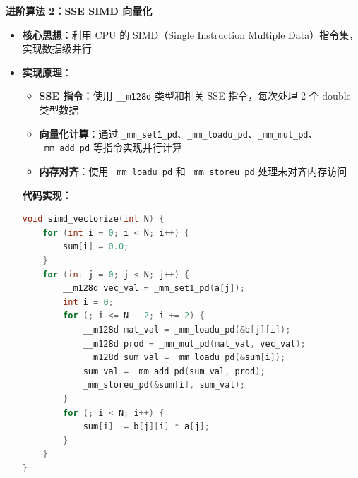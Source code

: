 ﻿\documentclass[9pt,a4paper]{article}
\begin{document}
\textbf{进阶算法 2：SSE SIMD 向量化}
\begin{itemize}
    \item \textbf{核心思想}：利用 CPU 的 SIMD（Single Instruction Multiple Data）指令集，实现数据级并行
    \item \textbf{实现原理}：
    \begin{itemize}
        \item \textbf{SSE 指令}：使用 \texttt{\_\_m128d} 类型和相关 SSE 指令，每次处理 2 个 double 类型数据
        \item \textbf{向量化计算}：通过 \texttt{\_mm\_set1\_pd}、\texttt{\_mm\_loadu\_pd}、\texttt{\_mm\_mul\_pd}、\texttt{\_mm\_add\_pd} 等指令实现并行计算
        \item \textbf{内存对齐}：使用 \texttt{\_mm\_loadu\_pd} 和 \texttt{\_mm\_storeu\_pd} 处理未对齐内存访问
    \end{itemize}



\textbf{代码实现：}
\begin{lstlisting}[language=C++]
void simd_vectorize(int N) {
    for (int i = 0; i < N; i++) {
        sum[i] = 0.0;
    }
    for (int j = 0; j < N; j++) {
        __m128d vec_val = _mm_set1_pd(a[j]);
        int i = 0;
        for (; i <= N - 2; i += 2) {
            __m128d mat_val = _mm_loadu_pd(&b[j][i]);
            __m128d prod = _mm_mul_pd(mat_val, vec_val);
            __m128d sum_val = _mm_loadu_pd(&sum[i]);
            sum_val = _mm_add_pd(sum_val, prod);
            _mm_storeu_pd(&sum[i], sum_val);
        }
        for (; i < N; i++) {
            sum[i] += b[j][i] * a[j];
        }
    }
}
\end{lstlisting}

\end{itemize}
\end{document}

